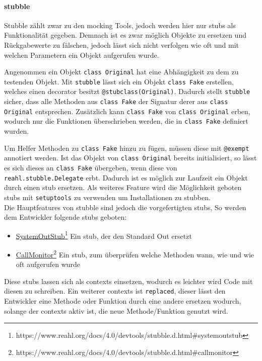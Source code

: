 \paragraph{stubble}\label{python-tools:stubble}\mbox{}
\newline
Stubble zählt zwar zu den \gls{mock}ing Tools, jedoch werden hier nur
\Glspl{stub} als Funktionalität gegeben. Demnach ist es zwar möglich Objekte
zu ersetzen und Rückgabewerte zu fälschen, jedoch lässt sich nicht verfolgen
wie oft und mit welchen Parametern ein Objekt aufgerufen wurde.

Angenommen ein Objekt \lstinline{class Original} hat eine Abhängigkeit zu dem zu
testenden Objekt. Mit \lstinline{stubble} lässt sich ein Objekt
\lstinline{class Fake} erstellen, welches einen \gls{decorator} besitzt
\lstinline{@stubclass(Original)}. Dadurch stellt \lstinline{stubble} sicher,
dass alle Methoden aus \lstinline{class Fake} der Signatur derer aus
\lstinline{class Original} entsprechen. Zusätzlich kann \lstinline{class Fake}
von \lstinline{class Original} erben, wodurch nur die Funktionen überschrieben
werden, die in \lstinline{class Fake} definiert wurden.

Um Helfer Methoden zu \lstinline{class Fake} hinzu zu fügen, müssen diese mit
\lstinline{@exempt} annotiert werden. Ist das Objekt von
\lstinline{class Original} bereits initialisiert, so lässt es sich dieses an
\lstinline{class Fake} übergeben, wenn diese von
\lstinline{reahl.stubble.Delegate} erbt. Dadurch ist es möglich zur Laufzeit
ein Objekt durch einen \Gls{stub} ersetzen. Als weiteres Feature wird die
Möglichkeit geboten \Glspl{stub} mit \lstinline{setuptools} zu verwenden um
Installationen zu \gls{stub}ben.
\newline
\\
Die Hauptfeatures von stubble sind jedoch die vorgefertigten \Glspl{stub}, So
werden dem Entwickler folgende \Glspl{stub} geboten:
\begin{itemize}
    \item \href{https://www.reahl.org/docs/4.0/devtools/stubble.d.html\#systemoutstub}{SystemOutStub}\footnote{https://www.reahl.org/docs/4.0/devtools/stubble.d.html\#systemoutstub}
    \subitem Ein \Gls{stub}, der den Standard Out ersetzt
    \item \href{https://www.reahl.org/docs/4.0/devtools/stubble.d.html\#callmonitor}{CallMonitor}\footnote{https://www.reahl.org/docs/4.0/devtools/stubble.d.html\#callmonitor}
    \subitem Ein \Gls{stub}, zum überprüfen welche Methoden wann, wie und wie oft aufgerufen wurde
\end{itemize}
\noindent
Diese \Glspl{stub} lassen sich als \glspl{context} einsetzen, wodurch es
leichter wird Code mit diesen zu schreiben. Ein weiterer \Glspl{context} ist
\lstinline{replaced}, dieser lässt den Entwickler eine Methode oder Funktion
durch eine andere ersetzen wodurch, solange der \glspl{context} aktiv ist, die
neue Methode/Funktion genutzt wird.
\newline

